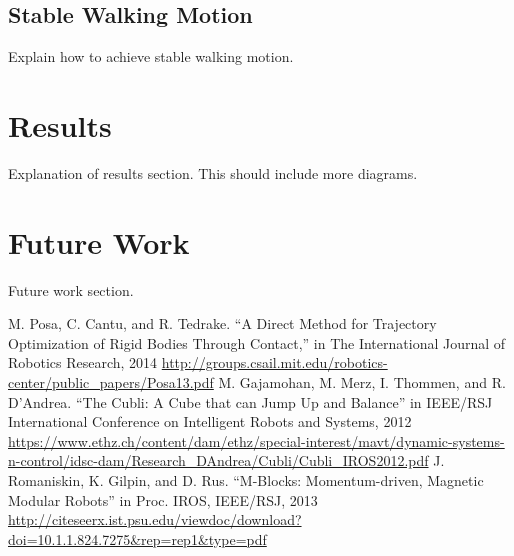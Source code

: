 \documentclass[conference]{IEEEtran}
\begin{document}
\subsection{Stable Walking Motion}

Explain how to achieve stable walking motion.

\section*{Results}

Explanation of results section. This should include more diagrams.

\section*{Future Work}

Future work section.

\begin{thebibliography}{00}
 M. Posa, C. Cantu, and R. Tedrake. ``A Direct Method for Trajectory Optimization of Rigid Bodies Through Contact,'' in The International Journal of Robotics Research, 2014 \url{http://groups.csail.mit.edu/robotics-center/public_papers/Posa13.pdf}
 M. Gajamohan, M. Merz, I. Thommen, and R. D'Andrea. ``The Cubli: A Cube that can Jump Up and Balance'' in IEEE/RSJ International Conference on
Intelligent Robots and Systems, 2012 \url{https://www.ethz.ch/content/dam/ethz/special-interest/mavt/dynamic-systems-n-control/idsc-dam/Research_DAndrea/Cubli/Cubli_IROS2012.pdf}
 J. Romaniskin, K. Gilpin, and D. Rus. ``M-Blocks: Momentum-driven, Magnetic Modular Robots'' in Proc. IROS, IEEE/RSJ, 2013
\url{http://citeseerx.ist.psu.edu/viewdoc/download?doi=10.1.1.824.7275&rep=rep1&type=pdf}
\end{thebibliography}
\vspace{12pt}
\end{document}
